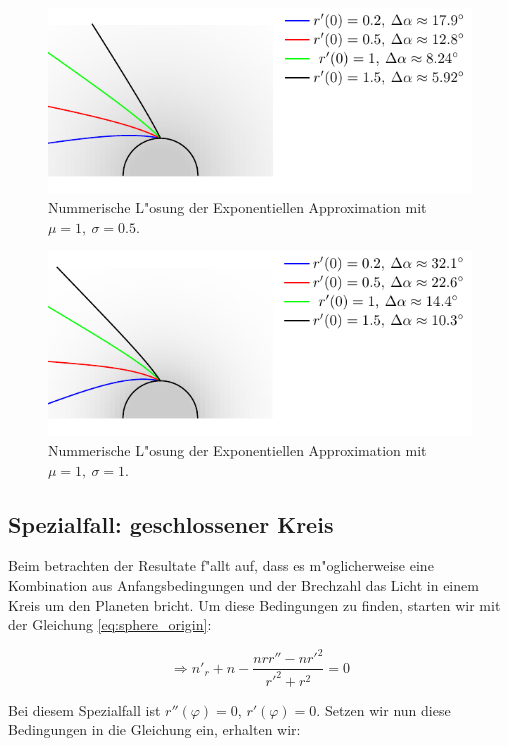 \begin{refsection}
\begin{figure}
\centering
\includegraphics[scale=1]{licht/standalone/fig_sphere_simulation1.pdf}
\caption{Nummerische L"osung der Exponentiellen Approximation mit $\mu = 1, \: \sigma = 0.5$. 
\label{fig:sphaerisches_modell2}}
\end{figure}

\begin{figure}
\centering
\includegraphics[scale=1]{licht/standalone/fig_sphere_simulation2.pdf}
\caption{Nummerische L"osung der Exponentiellen Approximation mit $\mu = 1, \: \sigma = 1$. \label{fig:sphaerisches_modell3} }
\end{figure}

\newpage

\subsection{Spezialfall: geschlossener Kreis}
Beim betrachten der Resultate f"allt auf, dass es m"oglicherweise eine Kombination aus Anfangsbedingungen und der Brechzahl das Licht in einem Kreis um den Planeten bricht. 
Um diese Bedingungen zu finden, starten wir mit der Gleichung \ref{eq:sphere_origin}:

$$\Rightarrow n'_r + n - \frac{n r r'' - n r'^2}{r'^2 + r^2} = 0$$

Bei diesem Spezialfall ist $r''(\varphi) = 0$, $r'(\varphi) = 0$. 
Setzen wir nun diese Bedingungen in die Gleichung ein, erhalten wir:


\end{refsection}
